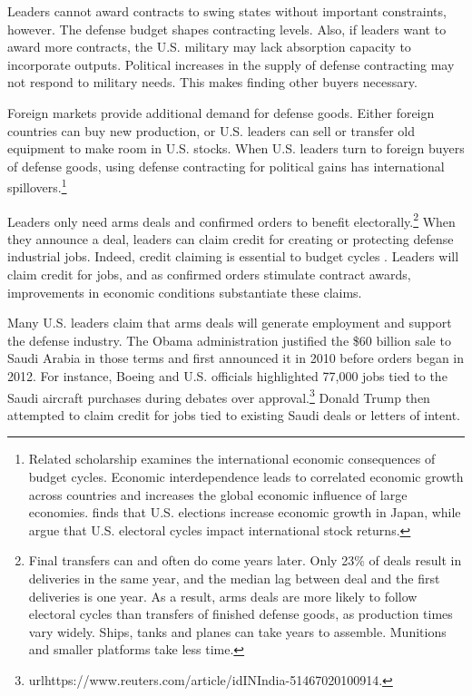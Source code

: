 \documentclass[12pt]{article}
\begin{document}
Leaders cannot award contracts to swing states without important constraints, however. 
The defense budget shapes contracting levels. 
Also, if leaders want to award more contracts, the U.S. military may lack absorption capacity to incorporate outputs.
Political increases in the supply of defense contracting may not respond to military needs.
This makes finding other buyers necessary.


Foreign markets provide additional demand for defense goods.
Either foreign countries can buy new production, or U.S. leaders can sell or transfer old equipment to make room in U.S. stocks. 
When U.S. leaders turn to foreign buyers of defense goods, using defense contracting for political gains has international spillovers.\footnote{%
Related scholarship examines the international economic consequences of budget cycles.
Economic interdependence leads to correlated economic growth across countries \citep{Kayser2006} and increases the global economic influence of large economies. 
\citet{Ito1991} finds that U.S. elections increase economic growth in Japan, while \citet{FoersterSchmitz1997} argue that U.S. electoral cycles impact international stock returns.
}


Leaders only need arms deals and confirmed orders to benefit electorally.\footnote{Final transfers can and often do come years later. 
Only 23\% of deals result in deliveries in the same year, and the median lag between deal and the first deliveries is one year. 
As a result, arms deals are more likely to follow electoral cycles than transfers of finished defense goods, as production times vary widely. 
Ships, tanks and planes can take years to assemble.
Munitions and smaller platforms take less time.}
When they announce a deal, leaders can claim credit for creating or protecting defense industrial jobs. 
Indeed, credit claiming is essential to budget cycles \citep{Bueno2021}. 
Leaders will claim credit for jobs, and as confirmed orders stimulate contract awards, improvements in economic conditions substantiate these claims. 


Many U.S. leaders claim that arms deals will generate employment and support the defense industry. 
The Obama administration justified the \$60 billion sale to Saudi Arabia in those terms and first announced it in 2010 before orders began in 2012.
For instance, Boeing and U.S. officials highlighted 77,000 jobs tied to the Saudi aircraft purchases during debates over approval.\footnote{url{https://www.reuters.com/article/idINIndia-51467020100914}.}
Donald Trump then attempted to claim credit for jobs tied to existing Saudi deals or letters of intent. 
\end{document}
